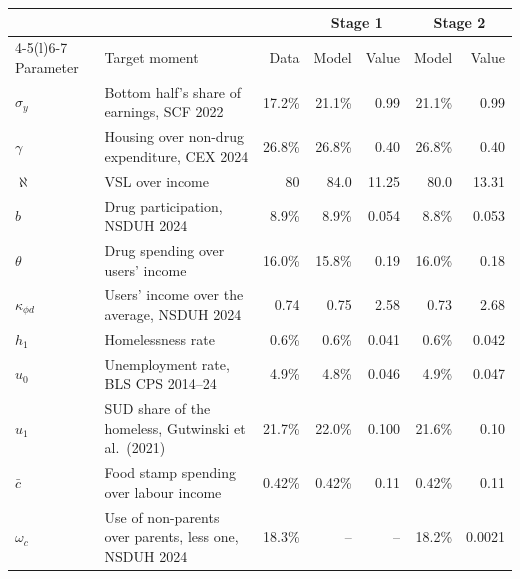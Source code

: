 \footnotesize\setlength{\tabcolsep}{4pt}
\begin{tabular}{@{}llrrrrr@{}}
\toprule
 & & & \multicolumn{2}{c}{Stage 1} & \multicolumn{2}{c}{Stage 2} \\
\cmidrule(lr){4-5}\cmidrule(l){6-7}
Parameter & Target moment & Data & Model & Value & Model & Value \\
\midrule
$\sigma_y$ & Bottom half's share of earnings, SCF 2022 & 17.2\% & 21.1\% & 0.99 & 21.1\% & 0.99 \\
$\gamma$ & Housing over non-drug expenditure, CEX 2024 & 26.8\% & 26.8\% & 0.40 & 26.8\% & 0.40 \\
$\aleph$ & VSL over income & 80 & 84.0 & 11.25 & 80.0 & 13.31 \\
$b$ & Drug participation, NSDUH 2024 & 8.9\% & 8.9\% & 0.054 & 8.8\% & 0.053 \\
$\theta$ & Drug spending over users' income & 16.0\% & 15.8\% & 0.19 & 16.0\% & 0.18 \\
$\kappa_{\phi d}$ & Users' income over the average, NSDUH 2024 & 0.74 & 0.75 & 2.58 & 0.73 & 2.68 \\
$h_1$ & Homelessness rate & 0.6\% & 0.6\% & 0.041 & 0.6\% & 0.042 \\
$u_0$ & Unemployment rate, BLS CPS 2014--24 & 4.9\% & 4.8\% & 0.046 & 4.9\% & 0.047 \\
$u_1$ & SUD share of the homeless, Gutwinski et al.\ (2021) & 21.7\% & 22.0\% & 0.100 & 21.6\% & 0.10 \\
$\bar c$ & Food stamp spending over labour income & 0.42\% & 0.42\% & 0.11 & 0.42\% & 0.11 \\
$\omega_c$ & Use of non-parents over parents, less one, NSDUH 2024 & 18.3\% & -- & -- & 18.2\% & 0.0021 \\
\bottomrule
\end{tabular}
